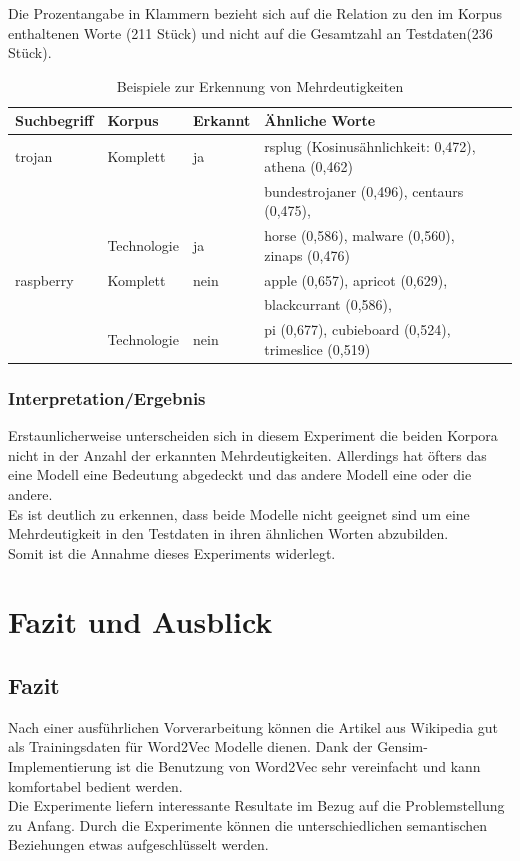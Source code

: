 \documentclass[12pt,a4paper]{report}
\begin{document}
		Die Prozentangabe in Klammern bezieht sich auf die Relation zu den im Korpus enthaltenen Worte (211 Stück) und nicht auf die Gesamtzahl an Testdaten(236 Stück).\\
		
\begin{table}[H]
\caption{Beispiele zur Erkennung von Mehrdeutigkeiten}
\begin{center}
\begin{tabular}{|l||l|l|l|l|}
\hline
Suchbegriff & Korpus & Erkannt & Ähnliche Worte   \\
\hline
\hline
 trojan & Komplett & ja &rsplug (Kosinusähnlichkeit: 0,472), athena (0,462)\\
 &	&	& bundestrojaner (0,496), centaurs (0,475), \\
 &  Technologie & ja & horse (0,586), malware (0,560), zinaps (0,476)\\
 \hline
 
raspberry& Komplett& nein & apple (0,657), apricot (0,629), \\
&&&blackcurrant (0,586),  \\
&Technologie & nein & pi (0,677), cubieboard (0,524), trimeslice (0,519)\\
\hline
 
\end{tabular}
\end{center}
\end{table}
		
		
		\subsection{Interpretation/Ergebnis}
		Erstaunlicherweise unterscheiden sich in diesem Experiment die beiden Korpora nicht in der Anzahl der erkannten Mehrdeutigkeiten. Allerdings hat öfters das eine Modell eine Bedeutung abgedeckt und das andere Modell eine oder die andere.\\
		Es ist deutlich zu erkennen, dass beide Modelle nicht geeignet sind um eine Mehrdeutigkeit in den Testdaten in ihren ähnlichen Worten abzubilden.\\
		Somit ist die Annahme dieses Experiments widerlegt.
		

\newpage
\chapter{Fazit und Ausblick}
\section{Fazit}
Nach einer ausführlichen Vorverarbeitung können die Artikel aus Wikipedia gut als Trainingsdaten für Word2Vec Modelle dienen. Dank der Gensim-Implementierung ist die Benutzung von Word2Vec sehr vereinfacht und kann komfortabel bedient werden.\\
Die Experimente liefern interessante Resultate im Bezug auf die Problemstellung zu Anfang. Durch die Experimente können die unterschiedlichen semantischen Beziehungen etwas aufgeschlüsselt werden.\\
\end{document}
